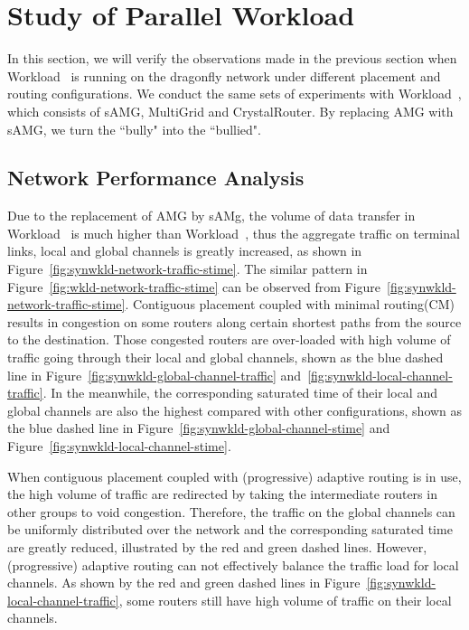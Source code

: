 
\section{Study of Parallel Workload }
\label{sec:workload-2}

In this section, we will verify the observations made in the previous section 
when Workload~ is running on the dragonfly network under different placement and routing configurations. 
We conduct the same sets of experiments with Workload~, which consists of sAMG, MultiGrid and CrystalRouter. 
By replacing AMG with sAMG, we turn the ``bully" into the ``bullied".


\subsection{Network Performance Analysis}
\label{sec: workload-2 network analysis}


Due to the replacement of AMG by sAMg, 
the volume of data transfer in Workload~ is much higher than Workload~, 
thus the aggregate traffic on terminal links, local and global channels is greatly increased, 
as shown in Figure~\ref{fig:synwkld-network-traffic-stime}. 
The similar pattern in Figure~\ref{fig:wkld-network-traffic-stime} can be observed from Figure~\ref{fig:synwkld-network-traffic-stime}.
Contiguous placement coupled with minimal routing(CM) results in congestion on some routers along certain shortest paths from the source to the destination. 
Those congested routers are over-loaded with high volume of traffic going through their local and global channels, 
shown as the blue dashed line in Figure~\ref{fig:synwkld-global-channel-traffic} and~\ref{fig:synwkld-local-channel-traffic}. 
In the meanwhile, the corresponding saturated time of their local and global channels are also the highest compared with other configurations, 
shown as the blue dashed line in Figure~\ref{fig:synwkld-global-channel-stime} and Figure~\ref{fig:synwkld-local-channel-stime}. 

When contiguous placement coupled with (progressive) adaptive routing is in use, the high volume of traffic are redirected by taking the intermediate routers in other groups to void congestion. Therefore, the traffic on the global channels can be uniformly distributed over the network and the corresponding saturated time are greatly reduced, illustrated by the red and green dashed lines. However, (progressive) adaptive routing can not effectively balance the traffic load for local channels. As shown by the red and green dashed lines in Figure~\ref{fig:synwkld-local-channel-traffic}, some routers still have high volume of traffic on their local channels. 


